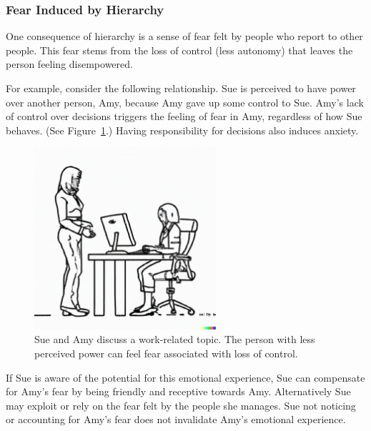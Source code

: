 \subsubsection*{Fear Induced by Hierarchy}

One consequence of hierarchy is a sense of fear felt by people who report to other people. This fear stems from the loss of control (less autonomy) that leaves the person feeling disempowered. 

For example, consider the following relationship. Sue is perceived to have power over another person, Amy, because Amy gave up some control to Sue. Amy's lack of control over decisions triggers the feeling of fear in Amy, regardless of how Sue behaves. (See Figure~\ref{fig:subordinate_and_supervisor}.) Having responsibility for decisions also induces anxiety.

\begin{figure}[H]
    \centering
\includegraphics[width=0.6\textwidth,trim={0 1cm 0 0},clip]{images/female_supervisor_standing_while_talking_to_seated_female_employee_typing_on_keyboard.pdf}
    \caption{Sue and Amy discuss a work-related topic. The person with less perceived power can feel fear associated with loss of control.}
    \label{fig:subordinate_and_supervisor}
\end{figure}



If Sue is aware of the potential for this emotional experience, Sue can compensate for Amy's fear by being friendly and receptive towards Amy. Alternatively Sue may exploit or rely on the fear felt by the people she manages. Sue not noticing or accounting for Amy's fear does not invalidate Amy's emotional experience.





